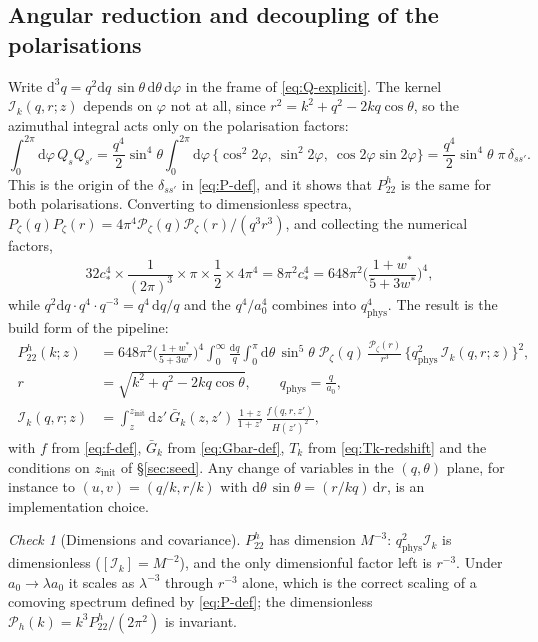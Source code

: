 \documentclass[11pt,a4paper]{article}
\newcommand{\cP}{\mathcal{P}}
\newcommand{\dd}{\mathrm{d}}
\newcommand{\Gb}{\bar{G}}
\newcommand{\zinit}{z_{\mathrm{init}}}
\newcommand{\wstar}{w^{*}}
\newcommand{\cstar}{c_{*}}
\newcommand{\qphys}{q_{\mathrm{phys}}}
\theoremstyle{remark}
\newtheorem*{chk}{Check}
\begin{document}
\subsection{Angular reduction and decoupling of the polarisations}

Write $\dd^3q = q^2\dd q\,\sin\theta\,\dd\theta\,\dd\varphi$ in the frame of \eqref{eq:Q-explicit}. The kernel $\mathcal{I}_k(q,r;z)$ depends on $\varphi$ not at all, since $r^2 = k^2+q^2-2kq\cos\theta$, so the azimuthal integral acts only on the polarisation factors:
\begin{equation}
\int_0^{2\pi}\dd\varphi\,Q_sQ_{s'} = \frac{q^4}{2}\sin^4\theta\int_0^{2\pi}\dd\varphi\,\{\cos^2 2\varphi,\ \sin^2 2\varphi,\ \cos2\varphi\sin2\varphi\} = \frac{q^4}{2}\sin^4\theta\;\pi\,\delta_{ss'} .
\label{eq:phi-integral}
\end{equation}
This is the origin of the $\delta_{ss'}$ in \eqref{eq:P-def}, and it shows that $P^h_{22}$ is the same for both polarisations. Converting to dimensionless spectra, $P_\zeta(q)P_\zeta(r) = 4\pi^4\cP_\zeta(q)\cP_\zeta(r)/(q^3r^3)$, and collecting the numerical factors,
\[
32\cstar^4\times\frac{1}{(2\pi)^3}\times\pi\times\frac12\times4\pi^4 = 8\pi^2\cstar^4 = 648\pi^2\Big(\frac{1+\wstar}{5+3\wstar}\Big)^4 ,
\]
while $q^2\dd q\cdot q^4\cdot q^{-3} = q^4\,\dd q/q$ and the $q^4/a_0^4$ combines into $\qphys^4$. The result is the build form of the pipeline:
\begin{equation}
\boxed{\;
\begin{aligned}
P^h_{22}(k;z) &= 648\pi^2\Big(\frac{1+\wstar}{5+3\wstar}\Big)^4
\int_0^\infty\frac{\dd q}{q}\int_0^\pi\dd\theta\,\sin^5\theta\;\cP_\zeta(q)\,\frac{\cP_\zeta(r)}{r^3}\,
\Big\{\qphys^2\,\mathcal{I}_k(q,r;z)\Big\}^2,\\[4pt]
r &= \sqrt{k^2+q^2-2kq\cos\theta},\qquad \qphys = \frac{q}{a_0},\\[4pt]
\mathcal{I}_k(q,r;z) &= \int_z^{\zinit}\dd z'\,\Gb_k(z,z')\,\frac{1+z}{1+z'}\,\frac{f(q,r,z')}{H(z')^2},
\end{aligned}\;}
\label{eq:P22-final}
\end{equation}
with $f$ from \eqref{eq:f-def}, $\Gb_k$ from \eqref{eq:Gbar-def}, $T_k$ from \eqref{eq:Tk-redshift} and the conditions on $\zinit$ of \S\ref{sec:seed}. Any change of variables in the $(q,\theta)$ plane, for instance to $(u,v) = (q/k,r/k)$ with $\dd\theta\,\sin\theta = (r/kq)\,\dd r$, is an implementation choice.

\begin{chk}[Dimensions and covariance]
$P^h_{22}$ has dimension $M^{-3}$: $\qphys^2\mathcal{I}_k$ is dimensionless ($[\mathcal{I}_k] = M^{-2}$), and the only dimensionful factor left is $r^{-3}$. Under $a_0\to\lambda a_0$ it scales as $\lambda^{-3}$ through $r^{-3}$ alone, which is the correct scaling of a comoving spectrum defined by \eqref{eq:P-def}; the dimensionless $\cP_{h}(k) = k^3P^h_{22}/(2\pi^2)$ is invariant.
\end{chk}
\end{document}
